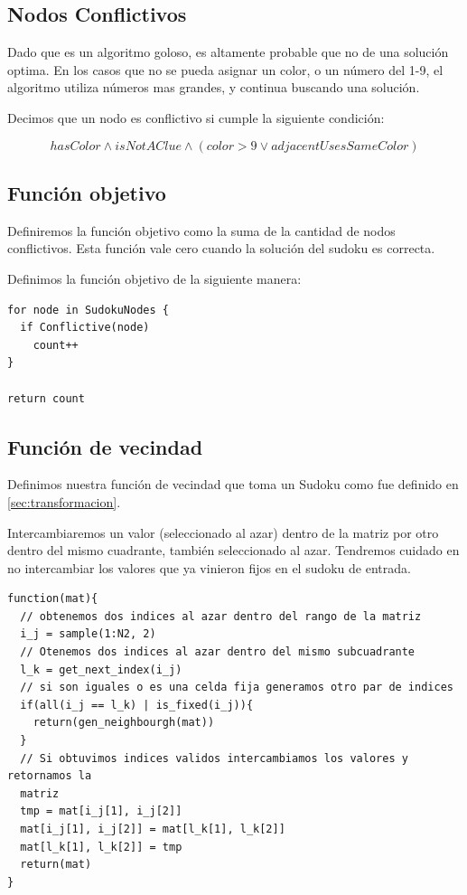 \documentclass[a4paper,spanish]{article}
\begin{document}
\subsection{Nodos Conflictivos}

Dado que es un algoritmo goloso, es altamente probable que no de una solución optima.
En los casos que no se pueda asignar un color, o un número del 1-9, el algoritmo
utiliza números mas grandes, y continua buscando una solución.

Decimos que un nodo es conflictivo si cumple la siguiente condición:

\begin{equation}
    hasColor \wedge isNotAClue \wedge ( color > 9 \vee adjacentUsesSameColor)
\end{equation}


\subsection{Función objetivo}

Definiremos la función objetivo como la suma de la cantidad de nodos conflictivos. 
Esta función vale cero cuando la solución del sudoku es correcta.

Definimos la función objetivo de la siguiente manera: 

\begin{Verbatim}[samepage=true]
for node in SudokuNodes {
  if Conflictive(node)
    count++
}

return count
\end{Verbatim}


\subsection{Función de vecindad}

Definimos nuestra función de vecindad que toma un Sudoku como fue
definido en \ref{sec:transformacion}.


Intercambiaremos un valor (seleccionado al azar) dentro de la matriz por otro
dentro del mismo cuadrante, también seleccionado al azar. Tendremos cuidado en
no intercambiar los valores que ya vinieron fijos en el sudoku de entrada.

\begin{Verbatim}[samepage=true]
function(mat){
  // obtenemos dos indices al azar dentro del rango de la matriz
  i_j = sample(1:N2, 2) 
  // Otenemos dos indices al azar dentro del mismo subcuadrante
  l_k = get_next_index(i_j)
  // si son iguales o es una celda fija generamos otro par de indices
  if(all(i_j == l_k) | is_fixed(i_j)){
    return(gen_neighbourgh(mat))
  }
  // Si obtuvimos indices validos intercambiamos los valores y retornamos la
  matriz
  tmp = mat[i_j[1], i_j[2]]
  mat[i_j[1], i_j[2]] = mat[l_k[1], l_k[2]]
  mat[l_k[1], l_k[2]] = tmp
  return(mat)
}

    
\end{Verbatim}
\end{document}
